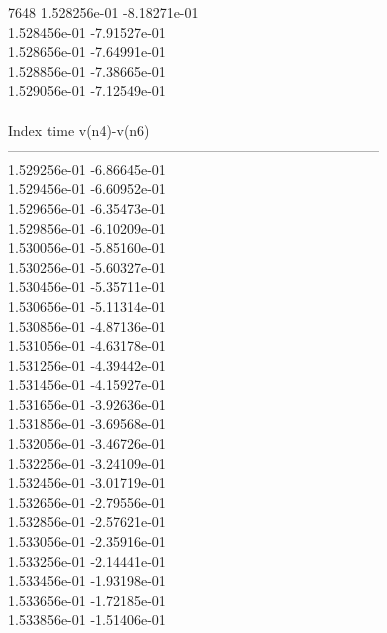 7648	1.528256e-01	-8.18271e-01	\\ 	1.528456e-01	-7.91527e-01	\\ 	1.528656e-01	-7.64991e-01	\\ 	1.528856e-01	-7.38665e-01	\\ 	1.529056e-01	-7.12549e-01	\\ \hline
\\ \hline
Index   time            v(n4)-v(n6)     \\ \hline
--------------------------------------------------------------------------------\\ 	1.529256e-01	-6.86645e-01	\\ 	1.529456e-01	-6.60952e-01	\\ 	1.529656e-01	-6.35473e-01	\\ 	1.529856e-01	-6.10209e-01	\\ 	1.530056e-01	-5.85160e-01	\\ 	1.530256e-01	-5.60327e-01	\\ 	1.530456e-01	-5.35711e-01	\\ 	1.530656e-01	-5.11314e-01	\\ 	1.530856e-01	-4.87136e-01	\\ 	1.531056e-01	-4.63178e-01	\\ 	1.531256e-01	-4.39442e-01	\\ 	1.531456e-01	-4.15927e-01	\\ 	1.531656e-01	-3.92636e-01	\\ 	1.531856e-01	-3.69568e-01	\\ 	1.532056e-01	-3.46726e-01	\\ 	1.532256e-01	-3.24109e-01	\\ 	1.532456e-01	-3.01719e-01	\\ 	1.532656e-01	-2.79556e-01	\\ 	1.532856e-01	-2.57621e-01	\\ 	1.533056e-01	-2.35916e-01	\\ 	1.533256e-01	-2.14441e-01	\\ 	1.533456e-01	-1.93198e-01	\\ 	1.533656e-01	-1.72185e-01	\\ 	1.533856e-01	-1.51406e-01	\\ \hline
